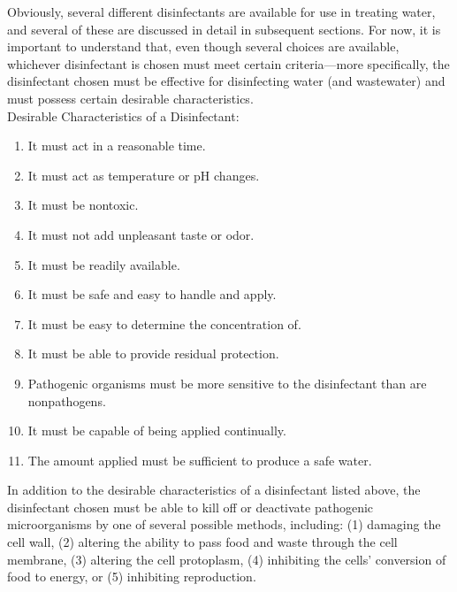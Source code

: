 Obviously, several different disinfectants are available for use in treating water, and several of these are discussed in detail in subsequent sections. For now, it is important to understand that, even though several choices are available, whichever disinfectant is chosen must meet certain criteria—more specifically, the disinfectant chosen must be effective for disinfecting water (and wastewater) and must possess certain desirable characteristics.\\
Desirable Characteristics of a Disinfectant:
\begin{enumerate}
\item It must act in a reasonable time.
\item It must act as temperature or pH changes.
\item It must be nontoxic.
\item It must not add unpleasant taste or odor.
\item It must be readily available.
\item It must be safe and easy to handle and apply.
\item It must be easy to determine the concentration of.
\item It must be able to provide residual protection.
\item Pathogenic organisms must be more sensitive to the disinfectant than are nonpathogens.
\item It must be capable of being applied continually.
\item The amount applied must be sufficient to produce a safe water.
\end{enumerate}
In addition to the desirable characteristics of a disinfectant listed above, the disinfectant chosen must be able to kill off or deactivate pathogenic microorganisms by one of several possible methods, including: (1) damaging the cell wall, (2) altering the ability to pass food and waste through the cell membrane, (3) altering the cell protoplasm,
(4) inhibiting the cells’ conversion of food to energy, or (5) inhibiting reproduction.\\

